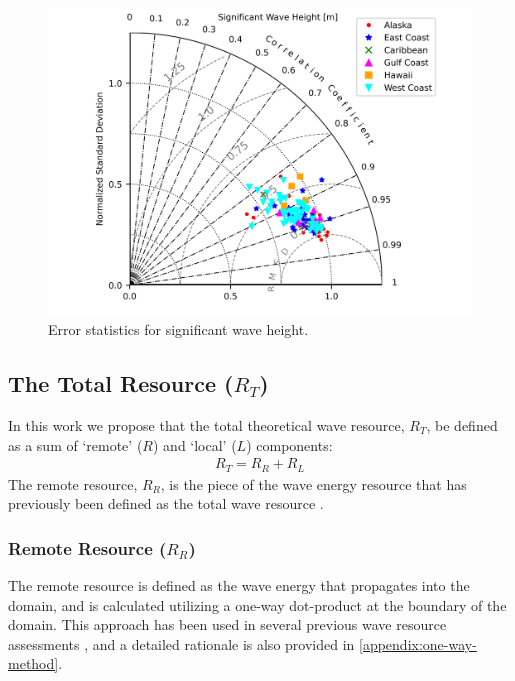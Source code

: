 \begin{figure}[ht]
  \centering
  \includegraphics[width=140mm]{../../fig/taylorBasicHs.png}
  \caption{Error statistics for significant wave height.}
  \label{fig:validationHs}
\end{figure}

\subsection{The Total Resource ($R_T$) \label{sec:method:calc}}

In this work we propose that the total theoretical wave resource, $R_T$, be defined as a sum of `remote' ($R$) and `local' ($L$) components:
\begin{align}
  R_T = R_R + R_L
\end{align}
The remote resource, $R_R$, is the piece of the wave energy resource that has previously been defined as the total wave resource \citep{gunnQuantifyingGlobalWave2012,EPRIwaveresource2011}.

\subsubsection{Remote Resource ($R_{R}$)} \label{sec:method:calc:remote}

The remote resource is defined as the wave energy that propagates into the domain, and is calculated utilizing a one-way dot-product at the boundary of the domain. This approach has been used in several previous wave resource assessments \citep{gunnQuantifyingGlobalWave2012, hemerRevisedAssessmentAustralia2017, regueroGlobalWavePower2015, garcia-medinaWaveResourceAssessment2014}, and a detailed rationale is also provided in \ref{appendix:one-way-method}. 

